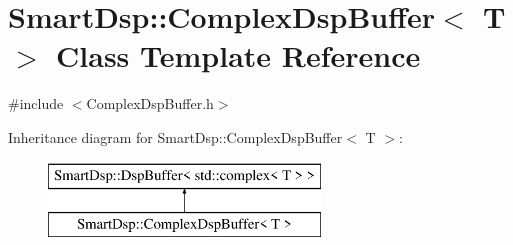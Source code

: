 \hypertarget{class_smart_dsp_1_1_complex_dsp_buffer}{\section{Smart\+Dsp\+:\+:Complex\+Dsp\+Buffer$<$ T $>$ Class Template Reference}
\label{class_smart_dsp_1_1_complex_dsp_buffer}
}


{\ttfamily \#include $<$Complex\+Dsp\+Buffer.\+h$>$}

Inheritance diagram for Smart\+Dsp\+:\+:Complex\+Dsp\+Buffer$<$ T $>$\+:\begin{figure}[H]
\begin{center}
\leavevmode
\includegraphics[height=2.000000cm]{class_smart_dsp_1_1_complex_dsp_buffer}
\end{center}
\end{figure}
